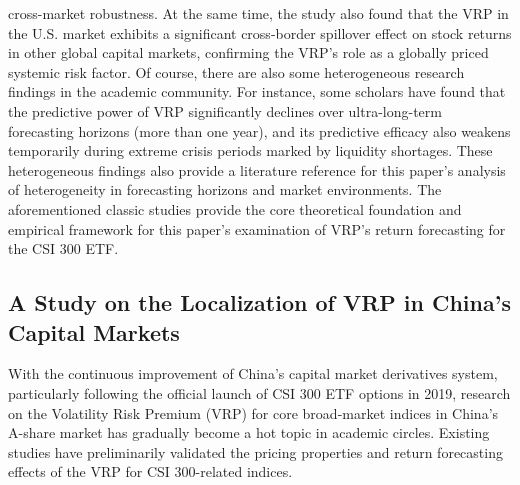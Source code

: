 \documentclass[a4paper, 12pt]{article}    %
\begin{document}
cross-market robustness. At the same time, the study also found that the VRP in the U.S. market exhibits a significant cross-border spillover effect on stock returns in other global capital markets, confirming the VRP’s role as a globally priced systemic risk factor. Of course, there are also some heterogeneous research findings in the academic community. For instance, some scholars have found that the predictive power of VRP significantly declines over ultra-long-term forecasting horizons (more than one year), and its predictive efficacy also weakens temporarily during extreme crisis periods marked by liquidity shortages. These heterogeneous findings also provide a literature reference for this paper’s analysis of heterogeneity in forecasting horizons and market environments. The aforementioned classic studies provide the core theoretical foundation and empirical framework for this paper’s examination of VRP’s return forecasting for the CSI 300 ETF.

\subsection{A Study on the Localization of VRP in China’s Capital Markets}

With the continuous improvement of China’s capital market derivatives system, particularly following the official launch of CSI 300 ETF options in 2019, research on the Volatility Risk Premium (VRP) for core broad-market indices in China’s A-share market has gradually become a hot topic in academic circles. Existing studies have preliminarily validated the pricing properties and return forecasting effects of the VRP for CSI 300-related indices.
\end{document}

